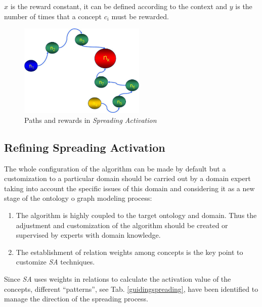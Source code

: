 $x$ is the reward constant, it can be defined according to the context and $y$
is the number of times that a concept $c_i$ must be rewarded.

\begin{figure}[h]
 \centering
    \includegraphics[width=6cm]{images/prize-sa}
    \caption{Paths and rewards in \textit{Spreading Activation}}
 \label{fig:prize-sa}
\end{figure}
  
  
\subsection{Refining Spreading Activation}
The whole configuration of the algorithm can be made by default but a customization
to a particular domain should be carried out by a domain expert taking into account the
specific issues of this domain and considering it as a new stage of 
the ontology o graph modeling process:

\begin{enumerate}
  \item The algorithm is highly coupled to the target ontology and domain. 
   Thus the adjustment and customization of the algorithm should be created or
  supervised by experts with domain knowledge. 
  \item The establishment of relation weights among concepts is
  the key point to customize \textit{SA} techniques. 
\end{enumerate}

Since \textit{SA} uses weights in relations  to calculate the activation
value of the concepts, different ``patterns'', see Tab.
\ref{guidingspreading}, have been identified to manage the direction of the spreading process.

